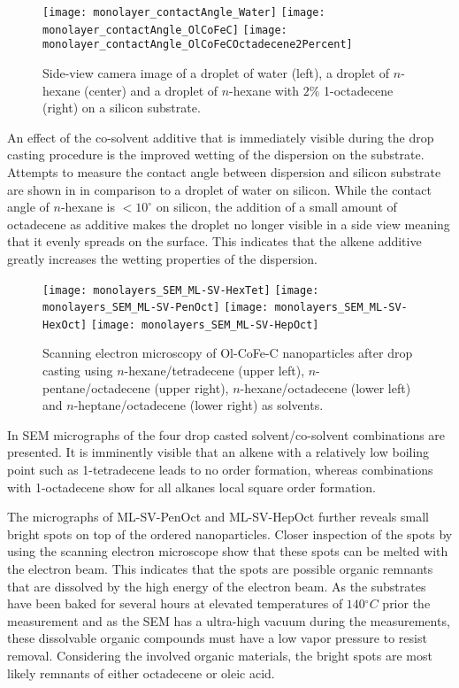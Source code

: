 \documentclass[\main/dresen_thesis.tex]{subfiles}
\begin{document}
    \begin{figure}[tb]
      \centering
      \texttt{[image: monolayer\_contactAngle\_Water]}
      \texttt{[image: monolayer\_contactAngle\_OlCoFeC]}
      \texttt{[image: monolayer\_contactAngle\_OlCoFeCOctadecene2Percent]}
      \caption{\label{fig:monolayers:preparation:contactAngle}Side-view camera image of a droplet of water (left), a droplet of $\mathit{n}$-hexane (center) and a droplet of $\mathit{n}$-hexane with $2 \unit{\%}$ 1-octadecene (right) on a silicon substrate.}
    \end{figure}
    An effect of the co-solvent additive that is immediately visible during the drop casting procedure is the improved wetting of the dispersion on the substrate.
    Attempts to measure the contact angle between dispersion and silicon substrate are shown in  in comparison to a droplet of water on silicon.
    While the contact angle of $\mathit{n}$-hexane is $<10^\circ$ on silicon, the addition of a small amount of octadecene as additive makes the droplet no longer visible in a side view meaning that it evenly spreads on the surface.
    This indicates that the alkene additive greatly increases the wetting properties of the dispersion.

    \begin{figure}[tb]
      \centering
      \texttt{[image: monolayers\_SEM\_ML-SV-HexTet]}
      \texttt{[image: monolayers\_SEM\_ML-SV-PenOct]}
      \texttt{[image: monolayers\_SEM\_ML-SV-HexOct]}
      \texttt{[image: monolayers\_SEM\_ML-SV-HepOct]}
      \caption{\label{fig:monolayers:preparation:solventVariation:sem}Scanning electron microscopy of Ol-CoFe-C nanoparticles after drop casting using $\mathit{n}$-hexane/tetradecene (upper left), $\mathit{n}$-pentane/octadecene (upper right), $\mathit{n}$-hexane/octadecene (lower left) and $\mathit{n}$-heptane/octadecene (lower right) as solvents.}
    \end{figure}
    In  SEM micrographs of the four drop casted solvent/co-solvent combinations are presented.
    It is imminently visible that an alkene with a relatively low boiling point such as 1-tetradecene leads to no order formation, whereas  combinations with 1-octadecene show for all alkanes local square order formation.

    The micrographs of ML-SV-PenOct and ML-SV-HepOct further reveals small bright spots on top of the ordered nanoparticles.
    Closer inspection of the spots by using the scanning electron microscope show that these spots can be melted with the electron beam.
    This indicates that the spots are possible organic remnants that are dissolved by the high energy of the electron beam.
    As the substrates have been baked for several hours at elevated temperatures of $140 \unit{^\circ C}$ prior the measurement and as the SEM has a ultra-high vacuum during the measurements, these dissolvable organic compounds must have a low vapor pressure to resist removal.
    Considering the involved organic materials, the bright spots are most likely remnants of either octadecene or oleic acid.
\end{document}
